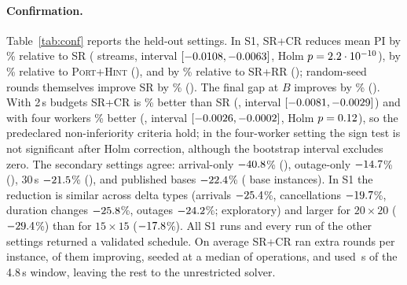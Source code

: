 \documentclass[letterpaper]{article} %
\newcommand{\base}{\textsc{SR}}
\newcommand{\crm}{\textsc{SR+CR}}
\newcommand{\rr}{\textsc{SR+RR}}
\newcommand{\ph}{\textsc{Port+Hint}}
\begin{document}
\paragraph{Confirmation.} Table~\ref{tab:conf} reports the held-out settings. In S1, \crm{} reduces mean PI by \SOneCandidateVsIaipSrRel\% relative to \base{} (\SOneCandidateVsIaipSrWL{} streams, interval $[-0.0108, -0.0063]$, Holm $p=2.2\cdot10^{-10}$), by \SOneCandidateVsPortfolioHintedRel\% relative to \ph{} (\SOneCandidateVsPortfolioHintedWL), and by \SOneCandidateVsRandomRoundsRel\% relative to \rr{} (\SOneCandidateVsRandomRoundsWL); random-seed rounds themselves improve \base{} by \SOneRandomRoundsVsIaipSrRel\% (\SOneRandomRoundsVsIaipSrWL). The final gap at $B$ improves by \SOneCandidateVsIaipSrGapRel\% (\SOneCandidateVsIaipSrGapWL). With 2\,s budgets \crm{} is \STwoCandidateVsIaipSrRel\% better than \base{} (\STwoCandidateVsIaipSrWL, interval $[-0.0081, -0.0029]$) and with four workers \SThreeCandidateVsIaipSrRel\% better (\SThreeCandidateVsIaipSrWL, interval $[-0.0026, -0.0002]$, Holm $p=0.12$), so the predeclared non-inferiority criteria hold; in the four-worker setting the sign test is not significant after Holm correction, although the bootstrap interval excludes zero. The secondary settings agree: arrival-only $-40.8$\% (\SFourCandidateVsIaipSrWL), outage-only $-14.7$\% (\SFiveCandidateVsIaipSrWL), 30\,s $-21.5$\% (\SSixCandidateVsIaipSrWL), and published bases $-22.4$\% (\SSevenCandidateVsIaipSrWL{} base instances). In S1 the reduction is similar across delta types (arrivals $-25.4$\%, cancellations $-19.7$\%, duration changes $-25.8$\%, outages $-24.2$\%; exploratory) and larger for $20{\times}20$ ($-29.4$\%) than for $15{\times}15$ ($-17.8$\%). All \SOneRecords{} S1 runs and every run of the other settings returned a validated schedule. On average \crm{} ran \SOneRoundsMean{} extra rounds per instance, \SOneRoundsImproving{} of them improving, seeded at a median of \SOneSeedsMedian{} operations, and used \SOneLocalS\,s of the 4.8\,s window, leaving the rest to the unrestricted solver.
\end{document}
